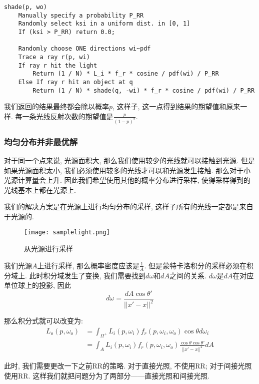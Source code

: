 \begin{lstlisting}[caption=包含递归停止条件的渲染函数伪代码]
shade(p, wo)
	Manually specify a probability P_RR
	Randomly select ksi in a uniform dist. in [0, 1]
	If (ksi > P_RR) return 0.0;
	 
	Randomly choose ONE directions wi~pdf
	Trace a ray r(p, wi)
	If ray r hit the light
		Return (1 / N) * L_i * f_r * cosine / pdf(wi) / P_RR
	Else If ray r hit an object at q
		Return (1 / N) * shade(q, -wi) * f_r * cosine / pdf(wi) / P_RR
\end{lstlisting}

我们返回的结果最终都会除以概率$p$, 这样子, 这一点得到结果的期望值和原来一样. 每一条光线反射次数的期望值是$\frac{p}{(1-p)^2}$.

\subsubsection{均匀分布并非最优解}

对于同一个点来说, 光源面积大, 那么我们使用较少的光线就可以接触到光源. 但是如果光源面积太小, 我们必须使用较多的光线才可以和光源发生接触. 那么对于小光源计算量会上升. 因此我们希望使用其他的概率分布进行采样, 使得采样得到的光线基本上都在光源上. 

我们的解决方案是在光源上进行均匀分布的采样, 这样子所有的光线一定都是来自于光源的. 

\begin{figure}[H]
	\centering
	\texttt{[image: samplelight.png]}
	\caption{从光源进行采样}
	\label{fig:samplelight}
\end{figure}

我们光源$A$上进行采样, 那么概率密度应该是$\frac{1}{A}$. 但是蒙特卡洛积分的采样必须在积分域上. 此时积分域发生了变换, 我们需要找到$d\omega$和$dA$之间的关系. $d\omega$是$dA$在对应单位球上的投影, 因此
\begin{equation}
	d\omega = \frac{dA\cos\theta'}{||x'-x||^2}
\end{equation}

那么积分式就可以改变为: 
\begin{equation}
	\begin{split}
		L_o(p,\omega_o)&=\int_{\Omega^+}L_i(p,\omega_i)f_r(p,\omega_i,\omega_o)\cos\theta d\omega_i\\
		&=\int_AL_i(p,\omega_i)f_r(p,\omega_i,\omega_o)\frac{\cos\theta\cos\theta'}{||x'-x||^2}dA
	\end{split}
\end{equation}

此时, 我们需要更改一下之前RR的策略. 对于直接光照, 不使用RR; 对于间接光照使用RR. 这样我们就把问题分为了两部分——直接光照和间接光照. 

